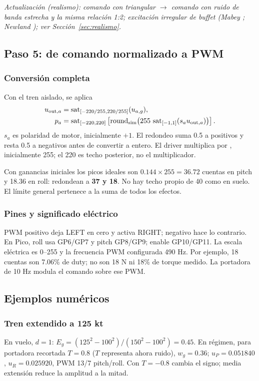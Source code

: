\textit{Actualización (realismo): comando con triangular $\rightarrow$ comando con ruido de banda estrecha y la misma relación 1:2; excitación irregular de buffet (Mabey \cite{mabey1988}; Newland \cite{newland1993}); ver Sección~\ref{sec:realismo}.}

\subsection{Paso 5: de comando normalizado a PWM}
\subsubsection{Conversión completa}
Con el tren aislado, se aplica
\begin{align}
u_{{\rm out},a}&=\operatorname{sat}_{[-220/255,220/255]}(u_{a,g}),\\
p_a&=\operatorname{sat}_{[-220,220]}\left[\operatorname{round}_{\rm sim}\!\left(255\,
\operatorname{sat}_{[-1,1]}(s_a u_{{\rm out},a})\right)\right].
\end{align}
$s_a$ es polaridad de motor, inicialmente $+1$. El redondeo suma 0.5 a positivos y resta 0.5 a negativos antes de convertir a entero. El driver multiplica por , inicialmente 255; el 220 es techo posterior, no el multiplicador.

Con ganancias iniciales los picos ideales son $0.144\times255=36.72$ cuentas en pitch y 18.36 en roll: redondean a \textbf{37 y 18}. No hay techo propio de 40 como en suelo. El límite general pertenece a la suma de todos los efectos.

\subsubsection{Pines y significado eléctrico}
PWM positivo deja LEFT en cero y activa RIGHT; negativo hace lo contrario. En Pico, roll usa GP6/GP7 y pitch GP8/GP9; enable GP10/GP11. La escala eléctrica es 0--255 y la frecuencia PWM configurada 490 Hz. Por ejemplo, 18 cuentas son 7.06\% de duty; no son 18 N ni 18\% de torque medido. La portadora de 10 Hz modula el comando sobre ese PWM.

\subsection{Ejemplos numéricos}
\subsubsection{Tren extendido a 125 kt}
En vuelo, $d=1$: $E_g=(125^2-100^2)/(150^2-100^2)=0.45$. En régimen, para portadora recortada $T=0.8$ ($T$ representa ahora ruido), $w_g=0.36$; $u_P=0.051840$, $u_R=0.025920$, PWM 13/7 pitch/roll. Con $T=-0.8$ cambia el signo; media extensión reduce la amplitud a la mitad.

